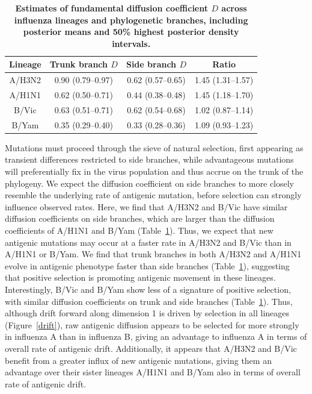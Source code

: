 \documentclass[11pt,oneside,letterpaper]{article}
\begin{document}
\begin{table}[h]
	\centering
	\caption{\textbf{Estimates of fundamental diffusion coefficient $D$ across influenza lineages and phylogenetic branches, including posterior means and 50\% highest posterior density intervals.}}
	\label{diffusiontable}	
	\begin{tabular}{ c c c c } 
	\hline
	Lineage	&	Trunk branch $D$ 	& 	Side branch $D$		& 	Ratio \\
	\hline		
	A/H3N2	&	0.90 (0.79--0.97)	&	0.62 (0.57--0.65)	&	1.45 (1.31--1.57) \\
	A/H1N1	&	0.62 (0.50--0.71)	&	0.44 (0.38--0.48)	&	1.45 (1.18--1.70) \\
	B/Vic	&	0.63 (0.51--0.71)	&	0.62 (0.54--0.68)	&	1.02 (0.87--1.14) \\
	B/Yam	&	0.35 (0.29--0.40)	&	0.33 (0.28--0.36)	&	1.09 (0.93--1.23) \\
	\hline
	\end{tabular}	
\end{table}

Mutations must proceed through the sieve of natural selection, first appearing as transient differences restricted to side branches, while advantageous mutations will preferentially fix in the virus population and thus accrue on the trunk of the phylogeny.
We expect the diffusion coefficient on side branches to more closely resemble the underlying rate of antigenic mutation, before selection can strongly influence observed rates.
Here, we find that A/H3N2 and B/Vic have similar diffusion coefficients on side branches, which are larger than the diffusion coefficients of A/H1N1 and B/Yam (Table~\ref{diffusiontable}).
Thus, we expect that new antigenic mutations may occur at a faster rate in A/H3N2 and B/Vic than in A/H1N1 or B/Yam.
We find that trunk branches in both A/H3N2 and A/H1N1 evolve in antigenic phenotype faster than side branches (Table~\ref{diffusiontable}), suggesting that positive selection is promoting antigenic movement in these lineages.
Interestingly, B/Vic and B/Yam show less of a signature of positive selection, with similar diffusion coefficients on trunk and side branches (Table~\ref{diffusiontable}).
Thus, although drift forward along dimension 1 is driven by selection in all lineages (Figure~\ref{drift}), raw antigenic diffusion appears to be selected for more strongly in influenza A than in influenza B, giving an advantage to influenza A in terms of overall rate of antigenic drift.
Additionally, it appears that A/H3N2 and B/Vic benefit from a greater influx of new antigenic mutations, giving them an advantage over their sister lineages A/H1N1 and B/Yam also in terms of overall rate of antigenic drift.
\end{document}
